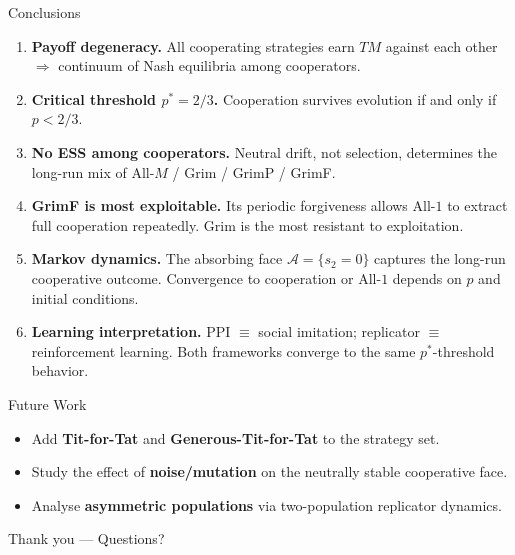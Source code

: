 \documentclass[aspectratio=169]{beamer}
\begin{document}
\begin{frame}{Conclusions}
  \begin{enumerate}
    \item \textbf{Payoff degeneracy.}
      All cooperating strategies earn $TM$ against each other $\Rightarrow$ continuum of Nash equilibria among cooperators.
    \item \textbf{Critical threshold $p^* = 2/3$.}
      Cooperation survives evolution if and only if $p < 2/3$.
    \item \textbf{No ESS among cooperators.}
      Neutral drift, not selection, determines the long-run mix of All-$M$ / Grim / GrimP / GrimF.
    \item \textbf{GrimF is most exploitable.}
      Its periodic forgiveness allows All-$1$ to extract full cooperation repeatedly.
      Grim is the most resistant to exploitation.
    \item \textbf{Markov dynamics.}
      The absorbing face $\mathcal{A} = \{s_2 = 0\}$ captures the long-run cooperative outcome.
      Convergence to cooperation or All-$1$ depends on $p$ and initial conditions.
    \item \textbf{Learning interpretation.}
      PPI $\equiv$ social imitation; replicator $\equiv$ reinforcement learning.
      Both frameworks converge to the same $p^*$-threshold behavior.
  \end{enumerate}
\end{frame}

\begin{frame}{Future Work}
  \begin{itemize}
    \item Add \textbf{Tit-for-Tat} and \textbf{Generous-Tit-for-Tat} to the strategy set.
    \item Study the effect of \textbf{noise/mutation} on the neutrally stable cooperative face.
    \item Analyse \textbf{asymmetric populations} via two-population replicator dynamics.
  \end{itemize}
  \vspace{20pt}
  \begin{center}
    \large Thank you --- Questions?
  \end{center}
\end{frame}

\end{document}

